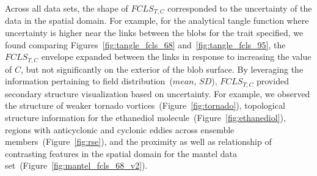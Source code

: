 %
%
Across all data sets, the shape of $FCLS_{T,C}$ corresponded to the uncertainty of the data in the spatial domain.
%
For example, for the analytical tangle function where uncertainty is higher near the links between the blobs for the trait specified, we found comparing Figures~\ref{fig:tangle_fcls_68} and~\ref{fig:tangle_fcls_95}, the $FCLS_{T,C}$ envelope expanded between the links in response to increasing the value of $C$, but not significantly on the exterior of the blob surface.
%
By leveraging the information pertaining to field distribution~($mean$, $SD$), $FCLS_{T,C}$ provided secondary structure visualization based on uncertainty.
%
%
For example, we observed the structure of weaker tornado vortices~(Figure~\ref{fig:tornado}), topological structure information for the ethanediol molecule~(Figure~\ref{fig:ethanediol}), regions with anticyclonic and cyclonic eddies across ensemble members~(Figure~\ref{fig:rse}), and the proximity as well as relationship of contrasting features in the spatial domain for the mantel data set~(Figure~\ref{fig:mantel_fcls_68_v2}).
%
%
%
 
